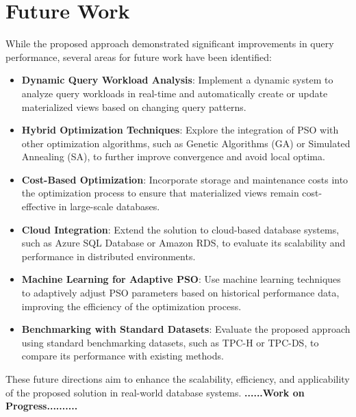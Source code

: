 \section{Future Work}
While the proposed approach demonstrated significant improvements in query performance, several areas for future work have been identified:

\begin{itemize}
    \item \textbf{Dynamic Query Workload Analysis}: Implement a dynamic system to analyze query workloads in real-time and automatically create or update materialized views based on changing query patterns.
    
    \item \textbf{Hybrid Optimization Techniques}: Explore the integration of PSO with other optimization algorithms, such as Genetic Algorithms (GA) or Simulated Annealing (SA), to further improve convergence and avoid local optima.
    
    \item \textbf{Cost-Based Optimization}: Incorporate storage and maintenance costs into the optimization process to ensure that materialized views remain cost-effective in large-scale databases.
    
    \item \textbf{Cloud Integration}: Extend the solution to cloud-based database systems, such as Azure SQL Database or Amazon RDS, to evaluate its scalability and performance in distributed environments.
    
    \item \textbf{Machine Learning for Adaptive PSO}: Use machine learning techniques to adaptively adjust PSO parameters based on historical performance data, improving the efficiency of the optimization process.
    
    \item \textbf{Benchmarking with Standard Datasets}: Evaluate the proposed approach using standard benchmarking datasets, such as TPC-H or TPC-DS, to compare its performance with existing methods.
\end{itemize}

These future directions aim to enhance the scalability, efficiency, and applicability of the proposed solution in real-world database systems.
\textbf{......\textbf{Work on Progress}..........}       